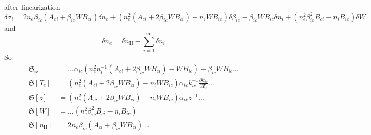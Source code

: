 \documentclass{article}
\begin{document}
after linearization
\begin{equation}
    \delta\sigma_i = 2n_e\beta_{ic}(A_{ci} + \beta_{ic}WB_{ci})\delta n_e + (n_e^2(A_{ci} + 2\beta_{ic}WB_{ci}) - n_iWB_{ic})\delta\beta_{ic} - \beta_{ic}WB_{ic}\delta n_i + (n_e^2\beta_{ic}^2B_{ci} - n_iB_{ic})\delta W
\end{equation}
and
\begin{equation}
    \delta n_e = \delta n_\mathrm{H} - \sum\limits_{i=1}^\infty\delta n_i
\end{equation}
So
\begin{equation}
    \begin{aligned}
        \mathfrak{S}_{ii} &= \ldots \alpha_{ic}(n_e^2n_i^{-1}(A_{ci} + 2\beta_{ic}WB_{ci}) - WB_{ic}) - \beta_{ic}WB_{ic}\ldots   \\ 
        \mathfrak{S}[T_e] &= (n_e^2(A_{ci} + 2\beta_{ic}WB_{ci}) - n_iWB_{ic})\alpha_{ic}k_{ic}^{-1}\frac{\partial k_{ic}}{\partial T_e} \ldots\\
        \mathfrak{S}[z] &= (n_e^2(A_{ci} + 2\beta_{ic}WB_{ci}) - n_iWB_{ic})\alpha_{ic}z^{-1} \ldots\\
        \mathfrak{S}[W] &= \ldots (n_e^2\beta_{ic}^2B_{ci} - n_iB_{ic})\\
        \mathfrak{S}[n_\mathrm{H}] &= 2n_e\beta_{ic}(A_{ci} + \beta_{ic}WB_{ci})\ldots
    \end{aligned}
\end{equation}
\end{document}
